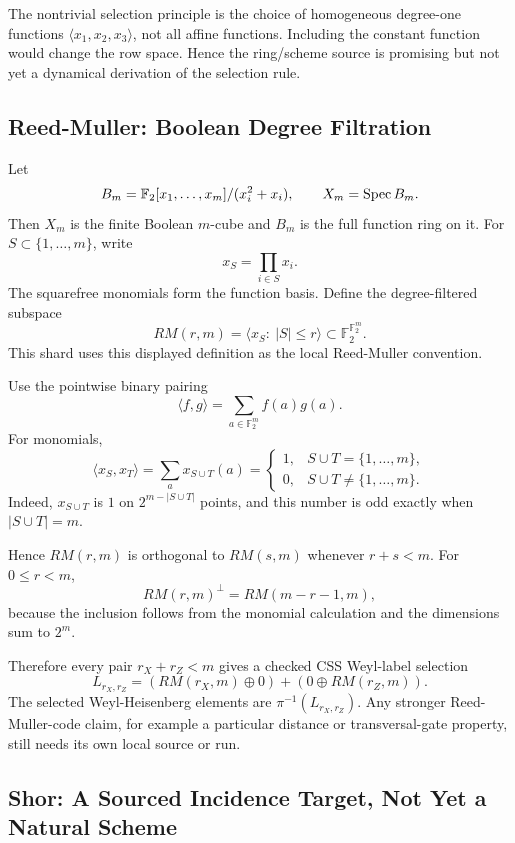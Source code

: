 The nontrivial selection principle is the choice of homogeneous degree-one
functions \(\langle x_1,x_2,x_3\rangle\), not all affine functions.  Including
the constant function would change the row space.  Hence the ring/scheme
source is promising but not yet a dynamical derivation of the selection rule.

\subsection{Reed-Muller: Boolean Degree Filtration}

Let
\[
  B_m=\mathbb F_2[x_1,\ldots,x_m]/(x_i^2+x_i),\qquad X_m=\operatorname{Spec} B_m .
\]
Then \(X_m\) is the finite Boolean \(m\)-cube and \(B_m\) is the full function
ring on it.  For \(S\subset\{1,\ldots,m\}\), write
\[
  x_S=\prod_{i\in S}x_i .
\]
The squarefree monomials form the function basis.  Define the degree-filtered
subspace
\[
  RM(r,m)=\langle x_S:\ |S|\le r\rangle\subset\mathbb F_2^{\mathbb F_2^m}.
\]
This shard uses this displayed definition as the local Reed-Muller convention.

Use the pointwise binary pairing
\[
  \langle f,g\rangle=\sum_{a\in\mathbb F_2^m} f(a)g(a).
\]
For monomials,
\[
  \langle x_S,x_T\rangle
  =
  \sum_a x_{S\cup T}(a)
  =
  \begin{cases}
  1,&S\cup T=\{1,\ldots,m\},\\
  0,&S\cup T\ne\{1,\ldots,m\}.
  \end{cases}
\]
Indeed, \(x_{S\cup T}\) is \(1\) on \(2^{m-|S\cup T|}\) points, and this number
is odd exactly when \(|S\cup T|=m\).

Hence \(RM(r,m)\) is orthogonal to \(RM(s,m)\) whenever \(r+s<m\).  For \(0\le r<m\),
\[
  RM(r,m)^\perp=RM(m-r-1,m),
\]
because the inclusion follows from the monomial calculation and the dimensions
sum to \(2^m\).

Therefore every pair \(r_X+r_Z<m\) gives a checked CSS Weyl-label selection
\[
  L_{r_X,r_Z}
  =
  (RM(r_X,m)\oplus0)+(0\oplus RM(r_Z,m)).
\]
The selected Weyl-Heisenberg elements are \(\pi^{-1}(L_{r_X,r_Z})\).  Any
stronger Reed-Muller-code claim, for example a particular distance or
transversal-gate property, still needs its own local source or run.

\subsection{Shor: A Sourced Incidence Target, Not Yet a Natural Scheme}

